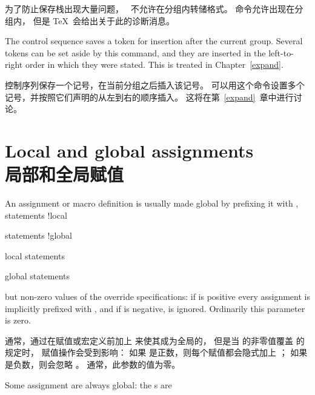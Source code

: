 为了防止保存栈出现大量问题，
\IniTeX\ 不允许在分组内转储格式。
 命令允许出现在分组内，
但是 \TeX\ 会给出关于此的诊断消息。

The  control sequence saves a token for
insertion after the current group. Several tokens can be
set aside by this command, and they are inserted in the left-to-right
order in which they were stated.
This is treated in Chapter~\ref{expand}.

 控制序列保存一个记号，在当前分组之后插入该记号。
可以用这个命令设置多个记号，并按照它们声明的从左到右的顺序插入。
这将在第~\ref{expand}~章中进行讨论。


\section{Local and global assignments\\局部和全局赋值}
\label{global:assign}

An assignment or macro definition
is usually made global by prefixing it with ,
\term statements !local\par\term statements !global\par
\term local statements\par\term global statements\par
but non-zero values of the 
 override 
specifications: if  is positive every assignment
is implicitly prefixed with , and if
 is negative,  is
ignored. Ordinarily this parameter is zero.

通常，通过在赋值或宏定义前加上  来使其成为全局的，
但是当   的非零值覆盖  的规定时，
赋值操作会受到影响：
如果  是正数，则每个赋值都会隐式加上 ；
如果  是负数，则会忽略 。
通常，此参数的值为零。

Some assignment are always global: the s are

